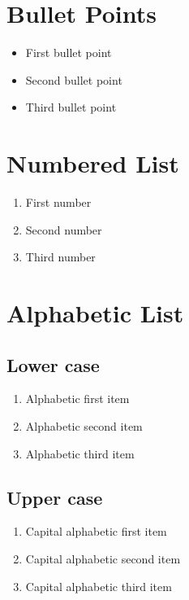 \documentclass{article}
\begin{document}
\section{Bullet Points}
\begin{itemize}
    \item First bullet point
    \item Second bullet point
    \item Third bullet point
\end{itemize}

\section{Numbered List}
\begin{enumerate}
    \item First number
    \item Second number
    \item Third number
\end{enumerate}

\section{Alphabetic List}

\subsection{Lower case}
\begin{enumerate}[label=\alph*.]
    \item Alphabetic first item
    \item Alphabetic second item
    \item Alphabetic third item
\end{enumerate}

\subsection{Upper case}
\begin{enumerate}[label=\Alph*.]
    \item Capital alphabetic first item
    \item Capital alphabetic second item
    \item Capital alphabetic third item
\end{enumerate}
\end{document}
